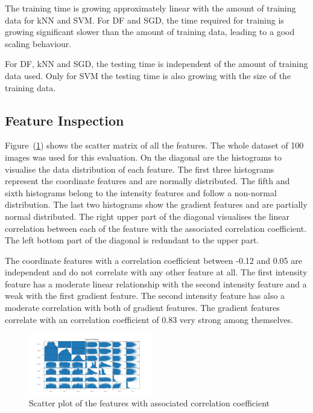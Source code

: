\documentclass[journal]{IEEEtran}
\begin{document}
The training time is growing approximately linear with the amount of training data for kNN and SVM. For DF and SGD, the time required for training is growing significant slower than the amount of training data, leading to a good scaling behaviour.

For DF, kNN and SGD, the testing time is independent of the amount of training data used. Only for SVM the testing time is also growing with the size of the training data.

\subsection{Feature Inspection}


Figure~(\ref{scatterplot}) shows the scatter matrix of all the features. The whole dataset of 100 images was used for this evaluation. On the diagonal are the histograms to visualise the data distribution of each feature. The first three histograms represent the coordinate features and are normally distributed. The fifth and sixth histograms belong to the intensity features and follow a non-normal distribution. The last two histograms show the gradient features and are partially normal distributed. The right upper part of the diagonal visualises the linear correlation between each of the feature with the associated correlation coefficient. The left bottom part of the diagonal is redundant to the upper part. 

The coordinate features with a correlation coefficient between -0.12 and 0.05 are independent and do not correlate with any other feature at all. The first intensity feature has a moderate linear relationship with the second intensity feature and a weak with the first gradient feature. The second intensity feature has also a moderate correlation with both of gradient features. The gradient features correlate with an correlation coefficient of 0.83 very strong among themselves.

\begin{figure}[h]
	\centering
	\includegraphics[width=0.48\textwidth]{images/ScatterPlotMatrix}
	\caption{Scatter plot of the features with associated correlation coefficient}
	\label{scatterplot}
\end{figure}
\end{document}
